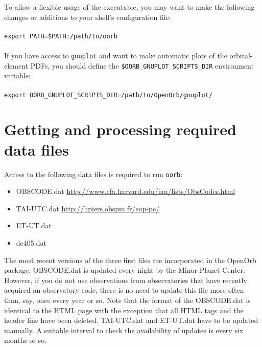 \documentclass[12pt,english,twoside,a4paper]{report}
\begin{document}
To allow a flexible usage of the executable, you may want to make the
following changes or additions to your shell's configuration file: \\ \\ 
\verb|export PATH=$PATH:/path/to/oorb| \\ \\
If you have access to \verb|gnuplot| and want to make automatic plots
of the orbital-element PDFs, you should define the
\verb|$OORB_GNUPLOT_SCRIPTS_DIR| environment variable: \\ \\ 
\verb|export OORB_GNUPLOT_SCRIPTS_DIR=/path/to/OpenOrb/gnuplot/|


\section{Getting and processing required data files}

Access to the following data files is required to run \verb|oorb|: 
\begin{itemize}
  \item OBSCODE.dat \href{http://www.cfa.harvard.edu/iau/lists/ObsCodes.html}{http://www.cfa.harvard.edu/iau/lists/ObsCodes.html}
  \item TAI-UTC.dat \href{http://hpiers.obspm.fr/eop-pc/}{http://hpiers.obspm.fr/eop-pc/}
  \item ET-UT.dat \href{}{}
  \item de405.dat
\end{itemize}
The most recent versions of the three first files are incorporated in
the OpenOrb package. OBSCODE.dat is updated every night by the Minor
Planet Center. However, if you do not use observations from
observatories that have recently acquired an observatory code, there
is no need to update this file more often than, say, once every year
or so. Note that the format of the OBSCODE.dat is identical to the
HTML page with the exception that all HTML tags and the header line
have been deleted. TAI-UTC.dat and ET-UT.dat have to be updated
manually. A suitable interval to check the availability of updates is
every six months or so.
\end{document}
